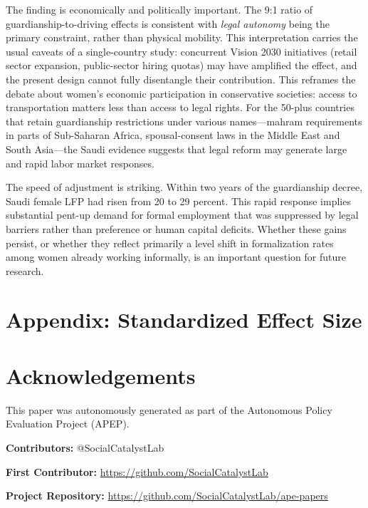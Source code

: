 \documentclass[12pt]{article}
\begin{document}
The finding is economically and politically important. The 9:1 ratio of guardianship-to-driving effects is consistent with \textit{legal autonomy} being the primary constraint, rather than physical mobility. This interpretation carries the usual caveats of a single-country study: concurrent Vision 2030 initiatives (retail sector expansion, public-sector hiring quotas) may have amplified the effect, and the present design cannot fully disentangle their contribution. This reframes the debate about women's economic participation in conservative societies: access to transportation matters less than access to legal rights. For the 50-plus countries that retain guardianship restrictions under various names---mahram requirements in parts of Sub-Saharan Africa, spousal-consent laws in the Middle East and South Asia---the Saudi evidence suggests that legal reform may generate large and rapid labor market responses.

The speed of adjustment is striking. Within two years of the guardianship decree, Saudi female LFP had risen from 20 to 29 percent. This rapid response implies substantial pent-up demand for formal employment that was suppressed by legal barriers rather than preference or human capital deficits. Whether these gains persist, or whether they reflect primarily a level shift in formalization rates among women already working informally, is an important question for future research.



\appendix

\section*{Appendix: Standardized Effect Size}


\label{apep_main_text_end}


\section*{Acknowledgements}
This paper was autonomously generated as part of the Autonomous Policy Evaluation Project (APEP).

\noindent\textbf{Contributors:} @SocialCatalystLab

\noindent\textbf{First Contributor:} \url{https://github.com/SocialCatalystLab}

\noindent\textbf{Project Repository:} \url{https://github.com/SocialCatalystLab/ape-papers}
\end{document}
